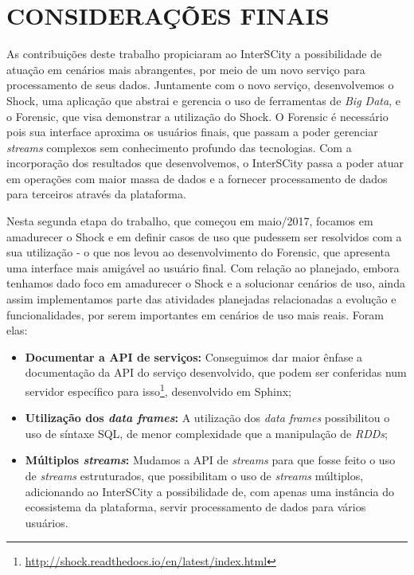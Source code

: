\chapter{CONSIDERAÇÕES FINAIS}
\label{chapter:final}

As contribuições deste trabalho propiciaram ao InterSCity a possibilidade de
atuação em cenários mais abrangentes, por meio de um novo serviço
para processamento de seus dados. Juntamente com o novo serviço, desenvolvemos
o Shock, uma aplicação que abstrai e gerencia o uso de ferramentas de
\textit{Big Data}, e o Forensic, que visa demonstrar a utilização do Shock.
O Forensic é necessário pois sua interface aproxima os usuários finais, que
passam a poder gerenciar \textit{streams} complexos sem conhecimento profundo
das tecnologias.
Com a incorporação dos resultados que desenvolvemos, o InterSCity passa a poder
atuar em operações com maior massa de dados e a fornecer processamento de dados
para terceiros através da plataforma.

Nesta segunda etapa do trabalho, que começou em maio/2017, focamos em
amadurecer o Shock e em definir casos de uso que pudessem ser resolvidos com
a sua utilização - o que nos levou ao desenvolvimento do Forensic, que apresenta
uma interface mais amigável ao usuário final. Com relação ao planejado, embora
tenhamos dado foco em amadurecer o Shock e a solucionar cenários de uso, ainda
assim implementamos parte das atividades planejadas relacionadas a evolução e
funcionalidades, por serem importantes em cenários de uso mais reais. Foram
elas:

\begin{itemize}
    \item \textbf{Documentar a API de serviços:} Conseguimos dar maior ênfase a
        documentação da API do serviço desenvolvido, que podem ser conferidas
        num servidor específico para isso\footnote{\url{http://shock.readthedocs.io/en/latest/index.html}},
        desenvolvido em Sphinx;
    \item \textbf{Utilização dos \textit{data frames}:} A utilização dos
        \textit{data frames} possibilitou o uso de síntaxe SQL, de menor
        complexidade que a manipulação de \textit{RDDs};
    \item \textbf{Múltiplos \textit{streams}:} Mudamos a API de \textit{streams}
        para que fosse feito o uso de \textit{streams} estruturados, que
        possibilitam o uso de \textit{streams} múltiplos, adicionando ao
        InterSCity a possibilidade de, com apenas uma instância do ecossistema
        da plataforma, servir processamento de dados para vários usuários.
\end{itemize}

